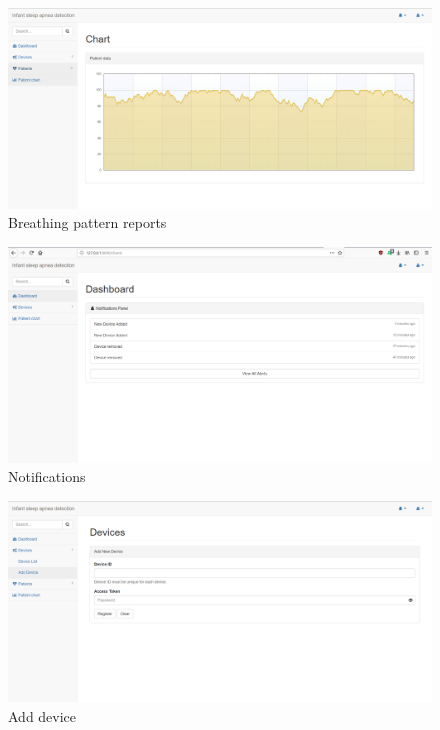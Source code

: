 \documentclass{article}
\begin{document}
\begin{figure}[h]
    \centering
    \includegraphics[scale=0.3]{chart.png}
    \caption{Breathing pattern reports}
    \label{fig:Breating pattern reports}
\end{figure}


\begin{figure}[h]
    \centering
    \includegraphics[scale=0.3]{dashboard.png}
    \caption{Notifications}
    \label{fig:Notifications}
\end{figure}

\begin{figure}[h]
    \centering
    \includegraphics[scale=0.3]{adddevice.png}
    \caption{Add device}
    \label{fig:Add device}
\end{figure}
\end{document}
